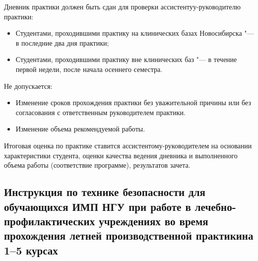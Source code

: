 \documentclass[a4paper,12pt]{extarticle}
\begin{document}
Дневник практики должен быть сдан для проверки ассистентуу\hyp{}руководителю практики:

\begin{itemize}
\item Студентами, проходившими практику на клинических базах Новосибирска "--- в последние два дня практики;
\item Студентами, проходившими практику вне клинических баз "--- в течение первой недели, после начала осеннего семестра.
\end{itemize}

Не допускается:

\begin{itemize}
\item Изменение сроков прохождения практики без уважительной причины или без согласования с ответственным руководителем практики.
\item Изменение объема рекомендуемой работы.
\end{itemize}

Итоговая оценка по практике ставится ассистентому\hyp{}руководителем на основании характеристики студента, оценки качества ведения дневника и выполненного объема работы (соответствие программе), результатов зачета.

\subsection*{Инструкция по технике безопасности для обучающихся ИМП НГУ при работе в лечебно-профилактических учреждениях во время прохождения летней производственной практикина 1--5 курсах}
\end{document}
